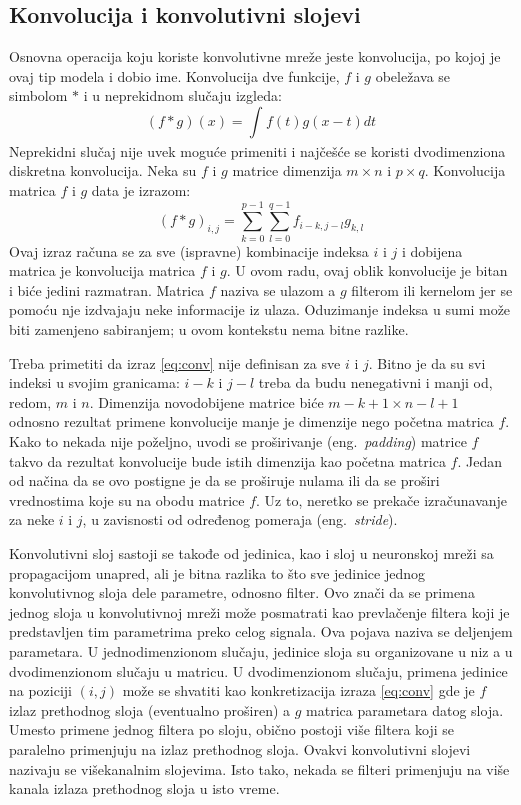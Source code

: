 \subsection{Konvolucija i konvolutivni slojevi} 
Osnovna operacija koju koriste konvolutivne mreže jeste konvolucija, po kojoj je ovaj tip modela i dobio ime. Konvolucija dve funkcije, $f$ i $g$ obeležava se simbolom $\ast$ i u neprekidnom slučaju izgleda:
\begin{equation}
	(f \ast g)(x) = \int_{}^{}f(t)g(x-t)dt 
\end{equation}
Neprekidni slučaj nije uvek moguće primeniti i najčešće se koristi dvodimenziona diskretna konvolucija. Neka su $f$ i $g$ matrice dimenzija $m\times n$ i $p \times q$. Konvolucija matrica $f$ i $g$ data je izrazom:
\begin{equation}
	\label{eq:conv}
	(f \ast g)_{i,j} = \sum_{k=0}^{p-1}\sum_{l=0}^{q-1} f_{i-k, j-l}g_{k,l}
\end{equation}
Ovaj izraz računa se za sve (ispravne) kombinacije indeksa $i$ i $j$ i dobijena matrica je konvolucija matrica $f$ i $g$.
U ovom radu, ovaj oblik konvolucije je bitan i biće jedini razmatran. Matrica $f$ naziva se ulazom a $g$ filterom ili kernelom jer se pomoću nje izdvajaju neke informacije iz ulaza. Oduzimanje indeksa u sumi može biti zamenjeno sabiranjem; u ovom kontekstu nema bitne razlike. 
\par 
Treba primetiti da izraz \eqref{eq:conv} nije definisan za sve $i$ i $j$. Bitno je da su svi indeksi u svojim granicama: $i-k$ i $j-l$ treba da budu nenegativni i manji od, redom, $m$ i $n$. Dimenzija novodobijene matrice biće $m-k+1 \times n-l+1$ odnosno rezultat primene konvolucije manje je dimenzije nego početna matrica $f$. Kako to nekada nije poželjno, uvodi se proširivanje (eng.~{\em padding}) matrice $f$ takvo da rezultat konvolucije bude istih dimenzija kao početna matrica $f$. Jedan od načina da se ovo postigne je da se proširuje nulama ili da se proširi vrednostima koje su na obodu matrice $f$. Uz to, neretko se prekače izračunavanje za neke $i$ i $j$, u zavisnosti od određenog pomeraja (eng.~{\em stride}). 
\par 
Konvolutivni sloj sastoji se takođe od jedinica, kao i sloj u neuronskoj mreži sa propagacijom unapred, ali je bitna razlika to što sve jedinice jednog konvolutivnog sloja dele parametre, odnosno filter. Ovo znači da se primena jednog sloja u konvolutivnoj mreži može posmatrati kao prevlačenje filtera koji je predstavljen tim parametrima preko celog signala. Ova pojava naziva se deljenjem parametara. U jednodimenzionom slučaju, jedinice sloja su organizovane u niz a u dvodimenzionom slučaju u matricu. U dvodimenzionom slučaju, primena jedinice na poziciji $(i,j)$ može se shvatiti kao konkretizacija izraza \eqref{eq:conv} gde je $f$ izlaz prethodnog sloja (eventualno proširen) a $g$ matrica parametara datog sloja. Umesto primene jednog filtera po sloju, obično postoji više filtera koji se paralelno primenjuju na izlaz prethodnog sloja. Ovakvi konvolutivni slojevi nazivaju se višekanalnim slojevima. Isto tako, nekada se filteri primenjuju na više kanala izlaza prethodnog sloja u isto vreme.
